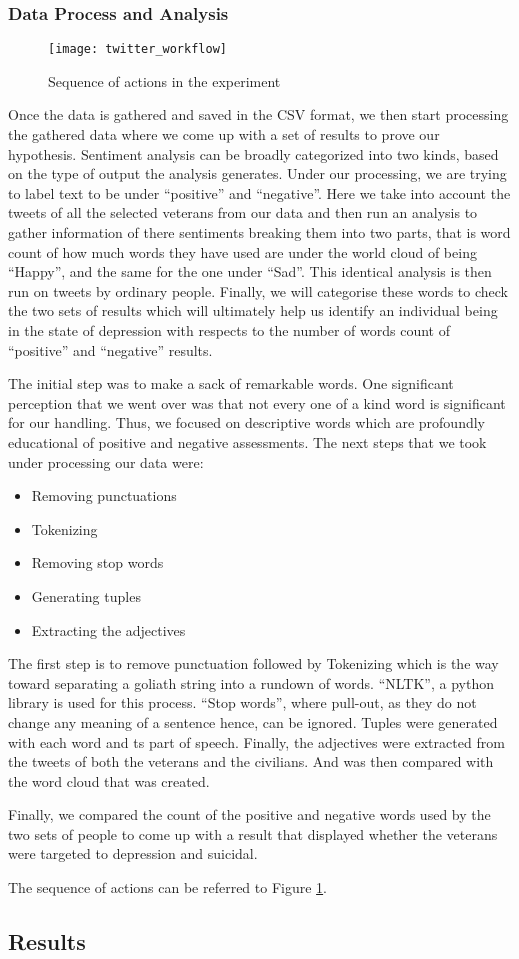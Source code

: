 \subsubsection{Data Process and Analysis}

\begin{figure}[h]
  \centering
  \caption{Sequence of actions in the experiment}
  \label{pic:workflow}
  \texttt{[image: twitter\_workflow]}
\end{figure}

Once the data is gathered and saved in the CSV format, we then start processing
the gathered data where we come up with a set of results to prove our
hypothesis. Sentiment analysis can be broadly categorized into two kinds, based
on the type of output the analysis generates. Under our processing, we are
trying to label text to be under \enquote{positive} and \enquote{negative}. Here we take into
account the tweets of all the selected veterans from our data and then run an
analysis to gather information of there sentiments breaking them into two parts,
that is word count of how much words they have used are under the world cloud
of being \enquote{Happy}, and the same for the one under \enquote{Sad}. This identical analysis
is then run on tweets by ordinary people. Finally, we will categorise these
words to check the two sets of results which will ultimately help us identify
an individual being in the state of depression with respects to the number of
words count of \enquote{positive} and \enquote{negative} results.

The initial step was to make a sack of remarkable words. One significant
perception that we went over was that not every one of a kind word is significant
for our handling. Thus, we focused on descriptive words which are profoundly
educational of positive and negative assessments. The next steps that we took
under processing our data were:

\begin{itemize}
  \item Removing punctuations
  \item Tokenizing
  \item Removing stop words
  \item Generating tuples
  \item Extracting the adjectives
\end{itemize}

The first step is to remove punctuation followed by Tokenizing which is the way
toward separating a goliath string into a rundown of words. \enquote{NLTK}, a python
library is used for this process. \enquote{Stop words}, where pull-out, as they do not
change any meaning of a sentence hence, can be ignored. Tuples were generated
with each word and ts part of speech. Finally, the adjectives were extracted
from the tweets of both the veterans and the civilians. And was then compared
with the word cloud that was created.

Finally, we compared the count of the positive and negative words used by the
two sets of people to come up with a result that displayed whether the veterans
were targeted to depression and suicidal.

The sequence of actions can be referred to Figure \ref{pic:workflow}.

\subsection{Results}
